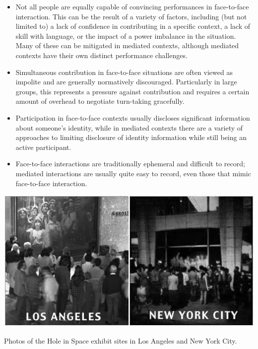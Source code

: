 \begin{itemize}
\item Not all people are equally capable of convincing performances in face-to-face interaction. This can be the result of a variety of factors, including (but not limited to) a lack of confidence in contributing in a specific context, a lack of skill with language, or the impact of a power imbalance in the situation. Many of these can be mitigated in mediated contexts\citep{Siegel:1986ve}, although mediated contexts have their own distinct performance challenges.
\item Simultaneous contribution in face-to-face situations are often viewed as impolite and are generally normatively discouraged. Particularly in large groups, this represents a pressure against contribution and requires a certain amount of overhead to negotiate turn-taking gracefully.
\item Participation in face-to-face contexts usually discloses significant information about someone's identity, while in mediated contexts there are a variety of approaches to limiting disclosure of identity information while still being an active participant.
\item Face-to-face interactions are traditionally ephemeral and difficult to record; mediated interactions are usually quite easy to record, even those that mimic face-to-face interaction. 
\end{itemize}




\begin{marginfigure}
	\includegraphics{figures/hole_in_space.jpg}
	\caption{Photos of the Hole in Space exhibit sites in Los Angeles and New York City.}
	\label{fig:hole-in-space}
\end{marginfigure}

